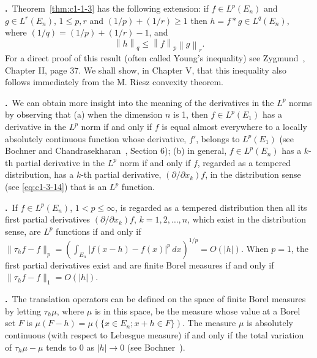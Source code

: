 \label{eq:c1-4-3}\textbf{\theequation.}~Theorem~\ref{thm:c1-1-3}
has the following extension: if $f \in L^{p}(E_{n})$ and $g \in L^{r}(E_{n})$,
$1 \leq p, r$ and $(1/p) + (1/r) \geq 1$ then $h = f * g \in L^{q}(E_{n})$,
where $(1/q) = (1/p) + (1/r) - 1$, and
\[
\left\|h\right\|_{q}\leq\left\|f\right\|_{p}\left\|g\right\|_{r}.
\]
For a direct proof of this result (often called Young's inequality) see
Zygmund~\cite{Zygmund1}, Chapter II, page 37. We shall show, in Chapter V, that
this inequality also follows immediately from the M. Riesz convexity theorem.

\label{eq:c1-4-4}\textbf{\theequation.}~We can obtain
more insight into the meaning of the derivatives in the $L^{p}$ norms by
observing that (a) when the dimension $n$ is 1, then $f \in L^{p}(E_{1})$ has
a derivative in the $L^{p}$ norm if and only if $f$ is equal almost everywhere
to a locally absolutely continuous function whose derivative, $f'$, belongs to
$L^{p}(E_{1})$ (see Bochner and Chandrasekharan~\cite{BochnerChandrasekharan1},
Section 6); (b) in general, $f \in L^{p}(E_{n})$ has a $k$-th partial
derivative in the $L^{p}$ norm if and only if $f$, regarded as a tempered
distribution, has a $k$-th partial derivative, $(\partial/\partial x_{k})f$, in
the distribution sense (see \eqref{eq:c1-3-14}) that is an $L^{p}$ function.

\label{eq:c1-4-5}\textbf{\theequation.}~If
$f \in L^{p}(E_{n})$, $1 < p \leq \infty$, is regarded as a tempered
distribution then all its first partial derivatives $(\partial/\partial x_{k})f$,
$k = 1, 2, \ldots, n$, which exist in the distribution sense, are $L^{p}$
functions if and only if
$\|\tau_{h}f - f\|_{p} = (\int_{E_{n}} |f(x - h) - f(x)|^{p} \, dx)^{1/p} = O(|h|)$.
When $p = 1$, the first partial derivatives exist and are finite Borel
measures if and only if $\|\tau_{h}f - f\|_{1} = O(|h|)$.

\label{eq:c1-4-6}\textbf{\theequation.}~The
translation operators can be defined on the space of finite Borel measures by
letting $\tau_{h}\mu$, where $\mu$ is in this space, be the measure whose
value at a Borel set $F$ is
$\mu(F - h) = \mu(\{x \in E_{n}; x + h \in F\})$. The measure $\mu$ is
absolutely continuous (with respect to Lebesgue measure) if and only if the
total variation of $\tau_{h}\mu - \mu$ tends to $0$ as $|h| \to 0$ (see
Bochner~\cite{Bochner4}).


